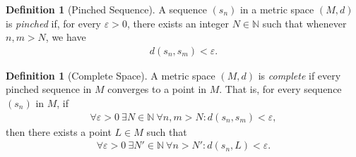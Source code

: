 \documentclass{amsart}
\numberwithin{equation}{section}
\theoremstyle{plain}
\theoremstyle{definition}
\newtheorem{definition}[theorem]{Definition}
\theoremstyle{remark}
\begin{document}
\begin{definition}[Pinched Sequence]
  A sequence $(s_n)$ in a metric space $(M, d)$ is \emph{pinched} if, for every $\varepsilon > 0$, there exists an integer $N \in \mathbb{N}$ such that whenever $n, m>N$, we have
  \begin{align*}
    d(s_n, s_m) < \varepsilon.
  \end{align*}
\end{definition}

\begin{definition}[Complete Space]
  A metric space $(M, d)$ is \emph{complete} if every pinched sequence in $M$ converges to a point in $M$.
  That is, for every sequence $(s_n)$ in $M$, if
  \begin{align*}
    \forall \varepsilon > 0\ \exists N \in \mathbb{N}\ \forall n, m> N: d(s_n, s_m) < \varepsilon,
  \end{align*}
  then there exists a point $L \in M$ such that
  \begin{align*}
    \forall \varepsilon > 0\ \exists N' \in \mathbb{N}\ \forall n > N': d(s_n, L) < \varepsilon.
  \end{align*}
\end{definition}
\end{document}
